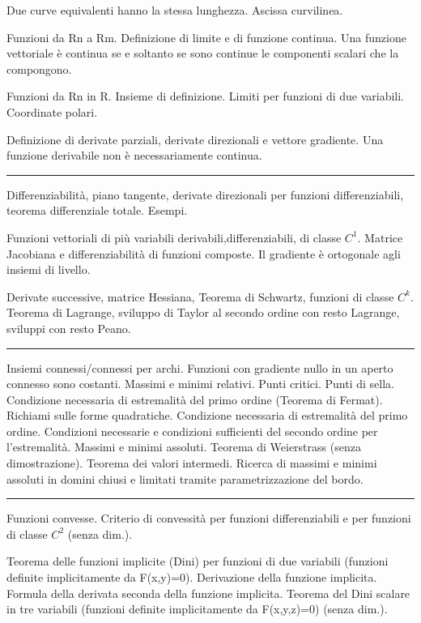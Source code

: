 \documentclass[a4paper,10pt]{article} %
\begin{document}
\begin{multicols}{2}
Due curve equivalenti hanno la stessa lunghezza. Ascissa curvilinea.

Funzioni da Rn a Rm. Definizione di limite e di funzione continua. Una funzione vettoriale è continua se e soltanto se sono continue le componenti scalari che la compongono.

Funzioni da Rn in R. Insieme di definizione. Limiti per funzioni di due variabili. Coordinate polari.

Definizione di derivate parziali, derivate direzionali e vettore gradiente. Una funzione derivabile non è necessariamente continua.




\bigbreak
\hrule
\bigbreak




Differenziabilità, piano tangente, derivate direzionali per funzioni differenziabili, teorema differenziale totale. Esempi.

Funzioni vettoriali di più variabili derivabili,differenziabili, di classe $C^1$. Matrice Jacobiana e differenziabilità di funzioni composte. Il gradiente è ortogonale agli insiemi di livello.

Derivate successive, matrice Hessiana, Teorema di Schwartz, funzioni di classe $C^k$. Teorema di Lagrange, sviluppo di Taylor al secondo ordine con resto Lagrange, sviluppi con resto Peano.



\bigbreak
\hrule
\bigbreak



Insiemi connessi/connessi per archi. Funzioni con gradiente nullo in un aperto connesso sono costanti. Massimi e minimi relativi. Punti critici. Punti di sella. Condizione necessaria di estremalità del primo ordine (Teorema di Fermat). Richiami sulle forme quadratiche. Condizione necessaria di estremalità del primo ordine. Condizioni necessarie e condizioni sufficienti del secondo ordine per l'estremalità. Massimi e minimi assoluti. Teorema di Weierstrass (senza dimostrazione). Teorema dei valori intermedi. Ricerca di massimi e minimi assoluti in domini chiusi e limitati tramite parametrizzazione del bordo.




\bigbreak
\hrule
\bigbreak





Funzioni convesse. Criterio di convessità per funzioni differenziabili e per funzioni di classe $C^2$ (senza dim.).

Teorema delle funzioni implicite (Dini) per funzioni di due variabili (funzioni definite implicitamente da F(x,y)=0). Derivazione della funzione implicita. Formula della derivata seconda della funzione implicita. Teorema del Dini scalare in tre variabili (funzioni definite implicitamente da F(x,y,z)=0) (senza dim.).





\end{multicols}
\end{document}
